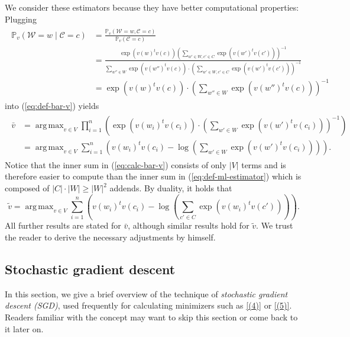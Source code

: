 \documentclass{amsart}
\theoremstyle{plain}
\theoremstyle{definition}
\renewcommand{\P}{\mathbb{P}}
\DeclareMathOperator*{\argmax}{arg\,max}
\begin{document}
We consider these estimators because they have better computational properties:
Plugging
\begin{align}
  \label{eq:conditional-probability}
  \begin{split}
    \P_v(\mathcal{W} = w \mid \mathcal{C} = c) & = \frac{\P_v(\mathcal{W} = w, \mathcal{C} = c)}{\P_v(\mathcal{C} = c)} \\
                                               & = \frac{\exp(v(w)^t v(c)) \left( \sum\limits_{w' \in W, c' \in C} \exp(v(w')^t v(c')) \right)^{-1}}{\sum\limits_{w'' \in W} \exp(v(w'')^t v(c)) \cdot \left( \sum\limits_{w' \in W, c' \in C} \exp(v(w')^t v(c')) \right)^{-1}} \\
                                               & = \exp(v(w)^t v(c)) \cdot \left( \sum\limits_{w'' \in W} \exp(v(w'')^t v(c)) \right)^{-1}
  \end{split}
\end{align}
into (\ref{eq:def-bar-v}) yields
\begin{align}
  \label{eq:calc-bar-v}
  \begin{split}
    \bar v & = \argmax_{v \in V} \prod_{i = 1}^n \left(\exp(v(w_i)^t v(c_i)) \cdot \left( \sum\limits_{w' \in W} \exp(v(w')^t v(c_i)) \right)^{-1} \right) \\
           & = \argmax_{v \in V} \sum_{i = 1}^n \left(v(w_i)^t v(c_i) - \log \left( \sum\limits_{w' \in W} \exp(v(w')^t v(c_i)) \right) \right).
  \end{split}
\end{align}
Notice that the inner sum in (\ref{eq:calc-bar-v}) consists of only $|V|$ terms and is therefore easier to compute than the inner sum in (\ref{eq:def-ml-estimator}) which is composed of $|C| \cdot |W| \geq |W|^2$ addends.
By duality, it holds that
\begin{equation}
  \label{eq:calc-tilde-v}
  \tilde v = \argmax_{v \in V} \sum_{i = 1}^n \left(v(w_i)^t v(c_i) - \log \left( \sum\limits_{c' \in C} \exp(v(w_i)^t v(c')) \right) \right).
\end{equation}
All further results are stated for $\bar v$, although similar results hold for $\tilde v$.
We trust the reader to derive the necessary adjustments by himself.

\subsection{Stochastic gradient descent}
In this section, we give a brief overview of the technique of \emph{stochastic gradient descent (SGD)}, used frequently for calculating minimizers such as \ref{(4)} or \ref{(5)}.
Readers familiar with the concept may want to skip this section or come back to it later on.
\end{document}
